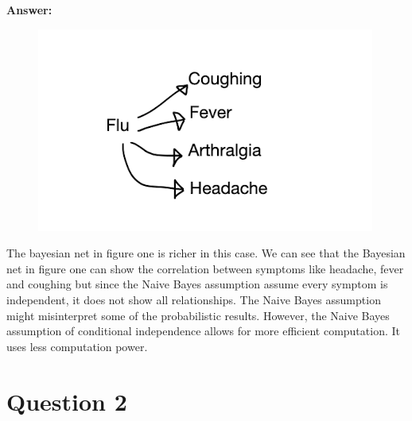 \documentclass[12pt]{article}
\begin{document}
\noindent\textbf{Answer:}

\begin{figure}[h!]
    \includegraphics[width=\linewidth]{img/q1.png}
\end{figure}

The bayesian net in figure one is richer in this case. We can see that the Bayesian net in figure one can show the correlation between symptoms like headache, fever and coughing but since the Naive Bayes assumption assume every symptom is independent, it does not show all relationships. The Naive Bayes assumption might misinterpret some of the probabilistic results. However, the Naive Bayes assumption of conditional independence allows for more efficient computation. It uses less computation power. 

\newpage


\section*{Question 2}
\end{document}
